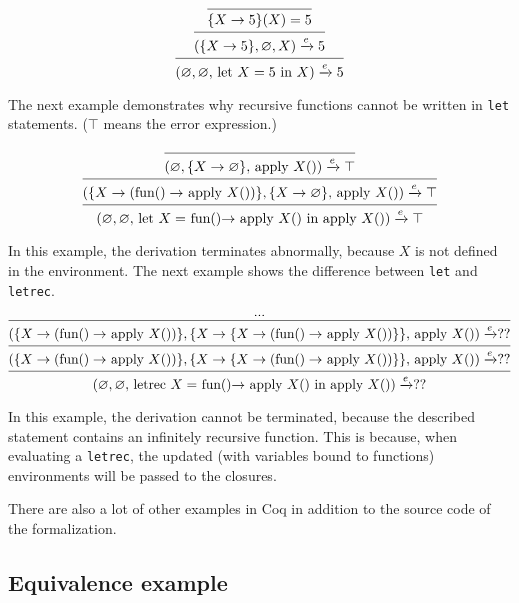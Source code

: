 \documentclass[12pt]{article}
\theoremstyle{definition}
\newcommand{\ose}{\xrightarrow{e}}
\numberwithin{equation}{section}
\begin{document}
\begin{equation}
\nonumber
	\begin{prooftree}
		\infer0{\{X \rightarrow 5\}(X) = 5}
		\infer1{(\{X \rightarrow 5\}, \varnothing, X) \ose 5}
		\infer1{(\varnothing, \varnothing,$ let $ X = 5$ in $X) \ose 5}
	\end{prooftree}
\end{equation}

The next example demonstrates why recursive functions cannot be written in \verb|let| statements. ($\top$ means the error expression.)

\begin{equation}
\nonumber
	\begin{prooftree}
		\infer0{(\varnothing, \{X \rightarrow \varnothing\}, $ apply $X()) \ose \top}
		\infer1{(\{X \rightarrow ($fun$() \rightarrow$ apply $X())\},\{X \rightarrow \varnothing\},$ apply $X()) \ose \top}
		\infer1{(\varnothing, \varnothing, $ let $X =$ fun()$ \rightarrow $ apply $X()$ in apply $ X()) \ose \top}
	\end{prooftree}
\end{equation}

In this example, the derivation terminates abnormally, because $X$ is not defined in the environment. The next example shows the difference between \verb|let| and \verb|letrec|.

\begin{equation}
\nonumber
	\begin{prooftree}
		\hypo{...}
		\infer1{(\{X \rightarrow ($fun$() \rightarrow$ apply $X())\}, \{X \rightarrow \{X \rightarrow ($fun$() \rightarrow$ apply $X())\}\}, $ apply $X()) \ose ??}
		\infer1{(\{X \rightarrow ($fun$() \rightarrow$ apply $X())\},\{X \rightarrow \{X \rightarrow ($fun$() \rightarrow$ apply $X())\}\},$ apply $X()) \ose ??}
		\infer1{(\varnothing, \varnothing, $ letrec $X =$ fun()$ \rightarrow $ apply $X()$ in apply $ X()) \ose ??}
	\end{prooftree}
\end{equation}

In this example, the derivation cannot be terminated, because the described statement contains an infinitely recursive function. This is because, when evaluating a \verb|letrec|, the updated (with variables bound to functions) environments will be passed to the closures.

There are also a lot of other examples in Coq in addition to the source code of the formalization.

\subsection{Equivalence example}
\end{document}

